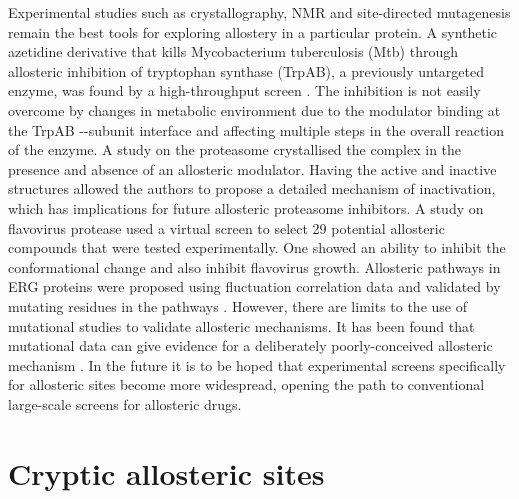 Experimental studies such as crystallography, NMR and site-directed mutagenesis remain the best tools for exploring allostery in a particular protein.
A synthetic azetidine derivative that kills Mycobacterium tuberculosis (Mtb) through allosteric inhibition of tryptophan synthase (TrpAB), a previously untargeted enzyme, was found by a high-throughput screen \cite{Wellington2017}.
The inhibition is not easily overcome by changes in metabolic environment due to the modulator binding at the TrpAB \textalpha -\textbeta -subunit interface and affecting multiple steps in the overall reaction of the enzyme.
A study on the proteasome \cite{Haselbach2017} crystallised the complex in the presence and absence of an allosteric modulator.
Having the active and inactive structures allowed the authors to propose a detailed mechanism of inactivation, which has implications for future allosteric proteasome inhibitors.
A study on flavovirus protease \cite{Brecher2017} used a virtual screen to select 29 potential allosteric compounds that were tested experimentally.
One showed an ability to inhibit the conformational change and also inhibit flavovirus growth.
Allosteric pathways in ERG proteins were proposed using fluctuation correlation data and validated by mutating residues in the pathways \cite{Ye2017}.
However, there are limits to the use of mutational studies to validate allosteric mechanisms.
It has been found that mutational data can give evidence for a deliberately poorly-conceived allosteric mechanism \cite{Tang2017}.
In the future it is to be hoped that experimental screens specifically for allosteric sites \cite{Martin2012, Jayakar2017, Pellerano2017, Pisco2017, Raman2014} become more widespread, opening the path to conventional large-scale screens for allosteric drugs.

\section{Cryptic allosteric sites}

